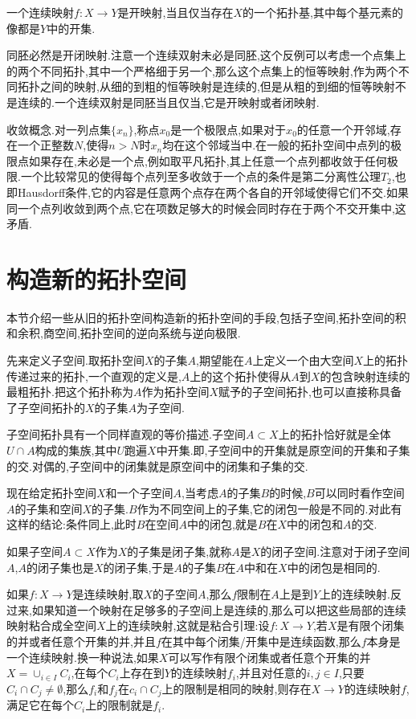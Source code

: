 一个连续映射$f:X\to Y$是开映射,当且仅当存在$X$的一个拓扑基,其中每个基元素的像都是$Y$中的开集.

同胚必然是开闭映射.注意一个连续双射未必是同胚,这个反例可以考虑一个点集上的两个不同拓扑,其中一个严格细于另一个,那么这个点集上的恒等映射,作为两个不同拓扑之间的映射,从细的到粗的恒等映射是连续的,但是从粗的到细的恒等映射不是连续的.一个连续双射是同胚当且仅当,它是开映射或者闭映射.

收敛概念.对一列点集$\{x_n\}$,称点$x_0$是一个极限点,如果对于$x_0$的任意一个开邻域,存在一个正整数$N$,使得$n>N$时$x_n$均在这个邻域当中.在一般的拓扑空间中点列的极限点如果存在,未必是一个点,例如取平凡拓扑,其上任意一个点列都收敛于任何极限.一个比较常见的使得每个点列至多收敛于一个点的条件是第二分离性公理$T_2$,也即Hausdorff条件,它的内容是任意两个点存在两个各自的开邻域使得它们不交.如果同一个点列收敛到两个点,它在项数足够大的时候会同时存在于两个不交开集中,这矛盾.
\newpage
\section{构造新的拓扑空间}

本节介绍一些从旧的拓扑空间构造新的拓扑空间的手段,包括子空间,拓扑空间的积和余积,商空间,拓扑空间的逆向系统与逆向极限.

先来定义子空间.取拓扑空间$X$的子集$A$,期望能在$A$上定义一个由大空间$X$上的拓扑传递过来的拓扑,一个直观的定义是,$A$上的这个拓扑使得从$A$到$X$的包含映射连续的最粗拓扑.把这个拓扑称为$A$作为拓扑空间$X$赋予的子空间拓扑,也可以直接称具备了子空间拓扑的$X$的子集$A$为子空间.

子空间拓扑具有一个同样直观的等价描述.子空间$A\subset X$上的拓扑恰好就是全体$U\cap A$构成的集族,其中$U$跑遍$X$中开集.即,子空间中的开集就是原空间的开集和子集的交.对偶的,子空间中的闭集就是原空间中的闭集和子集的交.

现在给定拓扑空间$X$和一个子空间$A$,当考虑$A$的子集$B$的时候,$B$可以同时看作空间$A$的子集和空间$X$的子集.$B$作为不同空间上的子集,它的闭包一般是不同的.对此有这样的结论:条件同上,此时$B$在空间$A$中的闭包,就是$B$在$X$中的闭包和$A$的交.

如果子空间$A\subset X$作为$X$的子集是闭子集,就称$A$是$X$的闭子空间.注意对于闭子空间$A$,$A$的闭子集也是$X$的闭子集,于是$A$的子集$B$在$A$中和在$X$中的闭包是相同的.

如果$f:X\to Y$是连续映射,取$X$的子空间$A$,那么$f$限制在$A$上是到$Y$上的连续映射.反过来,如果知道一个映射在足够多的子空间上是连续的,那么可以把这些局部的连续映射粘合成全空间$X$上的连续映射,这就是粘合引理:设$f:X\to Y$,若$X$是有限个闭集的并或者任意个开集的并,并且$f$在其中每个闭集/开集中是连续函数,那么$f$本身是一个连续映射.换一种说法,如果$X$可以写作有限个闭集或者任意个开集的并$X=\cup_{i\in I}C_i$,在每个$C_i$上存在到$Y$的连续映射$f_i$,并且对任意的$i,j\in I$,只要$C_i\cap C_j\not=\emptyset$,那么$f_i$和$f_j$在$c_i\cap C_j$上的限制是相同的映射,则存在$X\to Y$的连续映射$f$,满足它在每个$C_i$上的限制就是$f_i$.

